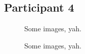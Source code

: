\lipsum[1]


\clearpage

\subsection{Participant 4}

\begin{figure}[h]
	\caption{Some images, yah.}
\end{figure}

\lipsum[1]

\clearpage

\begin{figure}[h]
	\caption{Some images, yah.}
\end{figure}

